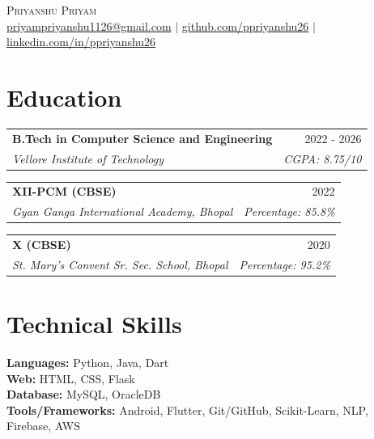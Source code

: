 \documentclass[a4paper,10pt]{article}
\makeatletter
\newcommand{\resumeSubheading}[4]{
  \vspace{1pt}\item
    \begin{tabular*}{\textwidth}{l@{\extracolsep{\fill}}r}
      \textbf{#1} & #2 \\
      \textit{\small#3} & \textit{\small #4} \\
    \end{tabular*}
}
\makeatother
\begin{document}
\begin{center}
  {\Huge \scshape Priyanshu Priyam} \\ \vspace{1pt}
  \href{mailto:priyampriyanshu1126@gmail.com}{priyampriyanshu1126@gmail.com} $|$
  \href{https://github.com/ppriyanshu26}{github.com/ppriyanshu26} $|$
  \href{https://linkedin.com/in/ppriyanshu26}{linkedin.com/in/ppriyanshu26}
\end{center}

\vspace{-8pt}
\section{Education}

\vspace{-4pt}
\begin{flushleft}
  \hspace{1.5em}
  \resumeSubheading
    {B.Tech in Computer Science and Engineering}{2022 - 2026}
    {Vellore Institute of Technology}{CGPA: 8.75/10}
\vspace{-6pt}
  \resumeSubheading
    {XII-PCM (CBSE)}{2022}
    {Gyan Ganga International Academy, Bhopal}{Percentage: 85.8\%}
\vspace{-6pt}
  \resumeSubheading
    {X (CBSE)}{2020}
    {St. Mary's Convent Sr. Sec. School, Bhopal}{Percentage: 95.2\%}
\end{flushleft}

\vspace{-6pt}
\section{Technical Skills}

\vspace{-4pt}
\hspace{1.5em}
\begin{flushleft}
  \textbf{Languages:} Python, Java, Dart \\[4pt]
  \textbf{Web:} HTML, CSS, Flask \\[4pt]
  \textbf{Database:} MySQL, OracleDB \\[4pt]
  \textbf{Tools/Frameworks:} Android, Flutter, Git/GitHub, Scikit-Learn, NLP, Firebase, AWS
\end{flushleft}



\vspace{-4pt}
\end{document}
